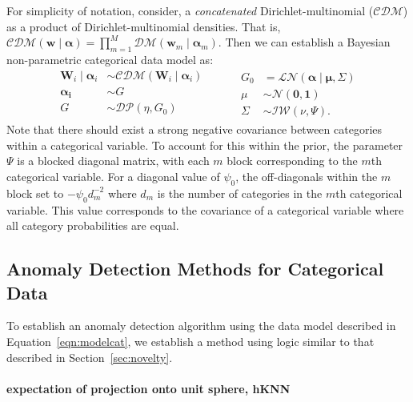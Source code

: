   For simplicity of notation, consider, a \emph{concatenated} Dirichlet-multinomial 
  ($\mathcal{CDM}$) as a product of Dirichlet-multinomial densities.  That is, 
  $\mathcal{CDM}(\bm{w}\mid\bm{\alpha}) = \prod_{m = 1}^M\mathcal{DM}(\bm{w}_m\mid\bm{\alpha}_m)$.
  Then we can establish a Bayesian non-parametric categorical data model as:
  \begin{equation}
    \label{eqn:modelcat}
    \begin{aligned}
      \bm{W}_i \mid \bm{\alpha}_i &\sim \mathcal{CDM}\left(\bm{W}_i\mid\bm{\alpha}_i\right)\\
      \bm{\alpha_i} &\sim G\\
      G &\sim \mathcal{DP}\left(\eta, G_0\right)\\
    \end{aligned}
    ~\hspace{1cm}
    \begin{aligned}
    G_0 &= \mathcal{LN}\left(\bm{\alpha}\mid\bm{\mu},\Sigma\right)\\
    \mu &\sim \mathcal{N}\left(\bm{0},\bm{1}\right)\\
    \Sigma &\sim \mathcal{IW}\left(\nu, \Psi\right).
    \end{aligned}
  \end{equation}
  Note that there should exist a strong negative covariance between categories 
  within a categorical variable.  To account for this within the prior, the 
  parameter $\Psi$ is a blocked diagonal matrix, with each $m$ block 
  corresponding to the $m$th categorical variable.  For a diagonal value of 
  $\psi_0$, the off-diagonals within the $m$ block set to $-\psi_0 d_m^{-2}$ 
  where $d_m$ is the number of categories in the $m$th categorical variable.
  This value corresponds to the covariance of a categorical variable where all 
  category probabilities are equal.

\subsection{Anomaly Detection Methods for Categorical Data}
To establish an anomaly detection algorithm using the data model described in 
  Equation~\ref{eqn:modelcat}, we establish a method using logic similar to that
  described in Section~\ref{sec:novelty}.   

  \paragraph{expectation of projection onto unit sphere, hKNN}

